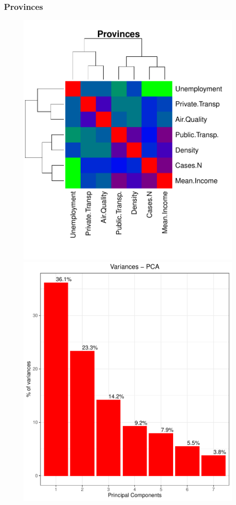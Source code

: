 \documentclass[compress]{beamer}
\begin{document}
\begin{frame}
\frametitle{Provinces}

\begin{figure}[H]
\centering
\begin{minipage}{.6\textwidth}
  \centering
  \includegraphics[width=\linewidth, ]{Pic/Province_FULL_CorrMatrix.pdf}
\end{minipage}%
\begin{minipage}{.3\textwidth}
  \centering
  \includegraphics[width=\linewidth,]{Pic/Province_FULL_Variances.pdf}

\end{minipage}
\end{figure}
\end{frame}
\end{document}
